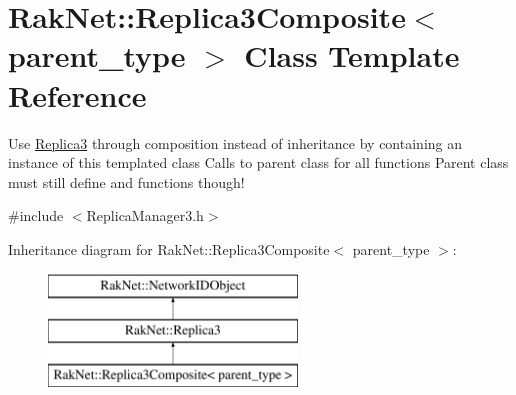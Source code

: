 \hypertarget{class_rak_net_1_1_replica3_composite}{\section{Rak\-Net\-:\-:Replica3\-Composite$<$ parent\-\_\-type $>$ Class Template Reference}
\label{class_rak_net_1_1_replica3_composite}
}


Use \hyperlink{class_rak_net_1_1_replica3}{Replica3} through composition instead of inheritance by containing an instance of this templated class Calls to parent class for all functions Parent class must still define and functions though!  




{\ttfamily \#include $<$Replica\-Manager3.\-h$>$}

Inheritance diagram for Rak\-Net\-:\-:Replica3\-Composite$<$ parent\-\_\-type $>$\-:\begin{figure}[H]
\begin{center}
\leavevmode
\includegraphics[height=3.000000cm]{class_rak_net_1_1_replica3_composite}
\end{center}
\end{figure}
